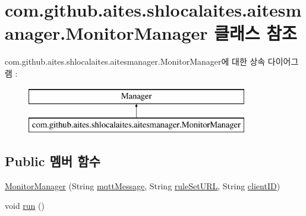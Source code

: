 \hypertarget{classcom_1_1github_1_1aites_1_1shlocalaites_1_1aitesmanager_1_1_monitor_manager}{}\section{com.\+github.\+aites.\+shlocalaites.\+aitesmanager.\+Monitor\+Manager 클래스 참조}
\label{classcom_1_1github_1_1aites_1_1shlocalaites_1_1aitesmanager_1_1_monitor_manager}
com.\+github.\+aites.\+shlocalaites.\+aitesmanager.\+Monitor\+Manager에 대한 상속 다이어그램 \+: \begin{figure}[H]
\begin{center}
\leavevmode
\includegraphics[height=2.000000cm]{classcom_1_1github_1_1aites_1_1shlocalaites_1_1aitesmanager_1_1_monitor_manager}
\end{center}
\end{figure}
\subsection*{Public 멤버 함수}
\begin{DoxyCompactItemize}
\item 
\mbox{\hyperlink{classcom_1_1github_1_1aites_1_1shlocalaites_1_1aitesmanager_1_1_monitor_manager_a3b70503f8d9e30293ca873067f5ce938}{Monitor\+Manager}} (String \mbox{\hyperlink{classcom_1_1github_1_1aites_1_1shlocalaites_1_1aitesmanager_1_1_monitor_manager_aa6b372acb4521c7de09fde3877240694}{mqtt\+Message}}, String \mbox{\hyperlink{classcom_1_1github_1_1aites_1_1shlocalaites_1_1aitesmanager_1_1_monitor_manager_a91d864b58034477cf84abf87943c29a5}{rule\+Set\+U\+RL}}, String \mbox{\hyperlink{classcom_1_1github_1_1aites_1_1shlocalaites_1_1aitesmanager_1_1_monitor_manager_ac2cb1a60aa97ac0801f4241fb6ac0b14}{client\+ID}})
\item 
void \mbox{\hyperlink{classcom_1_1github_1_1aites_1_1shlocalaites_1_1aitesmanager_1_1_monitor_manager_ab023eb072c881dd163cbd5c97d5bd7d1}{run}} ()
\end{DoxyCompactItemize}
